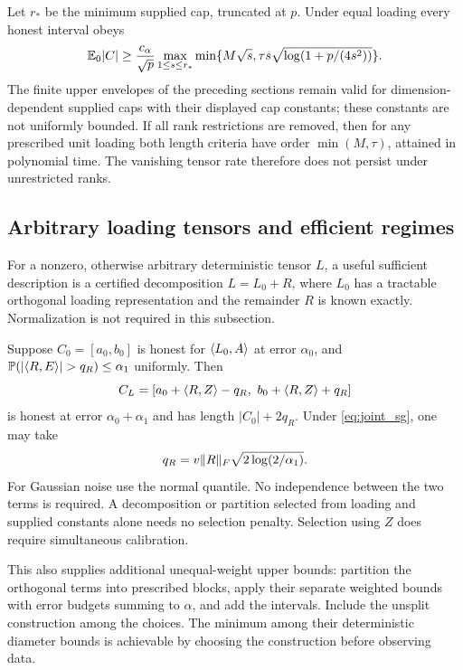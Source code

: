 \begin{proposition}\label{prop:growing_caps}
Let $r_*$ be the minimum supplied cap, truncated at $p$. Under equal loading every honest interval obeys
\[
 \mathbb E_0|C|\ge\frac{c_\alpha}{\sqrt p}
 \max_{1\le s\le r_*}
 \min\{M\sqrt s,\tau s\sqrt{\log(1+p/(4s^2))}\}.
\]
The finite upper envelopes of the preceding sections remain valid for dimension-dependent supplied caps with their displayed cap constants; these constants are not uniformly bounded. If all rank restrictions are removed, then for any prescribed unit loading both length criteria have order $\min(M,\tau)$, attained in polynomial time. The vanishing tensor rate therefore does not persist under unrestricted ranks.
\end{proposition}

\subsection{Arbitrary loading tensors and efficient regimes}

For a nonzero, otherwise arbitrary deterministic tensor $L$, a useful sufficient description is a certified decomposition $L=L_0+R$, where $L_0$ has a tractable orthogonal loading representation and the remainder $R$ is known exactly. Normalization is not required in this subsection.

\begin{proposition}\label{prop:loading_transfer}
Suppose $C_0=[a_0,b_0]$ is honest for $\langle L_0,A\rangle$ at error $\alpha_0$, and
$\PP(|\ip RE|>q_R)\le\alpha_1$ uniformly. Then
\[
 C_L=[a_0+\ip RZ-q_R,\ b_0+\ip RZ+q_R]
\]
is honest at error $\alpha_0+\alpha_1$ and has length $|C_0|+2q_R$.
Under \eqref{eq:joint_sg}, one may take
\[
 q_R=v\lVert R\rVert_F\sqrt{2\log(2/\alpha_1)}.
\]
For Gaussian noise use the normal quantile. No independence between the two terms is required. A decomposition or partition selected from loading and supplied constants alone needs no selection penalty. Selection using $Z$ does require simultaneous calibration.

This also supplies additional unequal-weight upper bounds: partition the orthogonal terms into prescribed blocks, apply their separate weighted bounds with error budgets summing to $\alpha$, and add the intervals. Include the unsplit construction among the choices. The minimum among their deterministic diameter bounds is achievable by choosing the construction before observing data.
\end{proposition}

